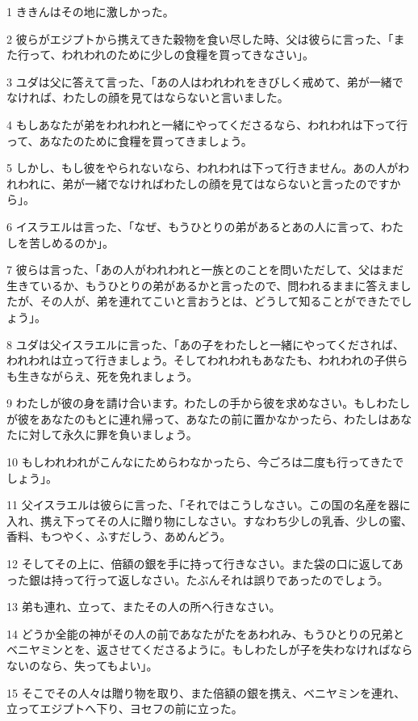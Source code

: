 \par 1 ききんはその地に激しかった。
\par 2 彼らがエジプトから携えてきた穀物を食い尽した時、父は彼らに言った、「また行って、われわれのために少しの食糧を買ってきなさい」。
\par 3 ユダは父に答えて言った、「あの人はわれわれをきびしく戒めて、弟が一緒でなければ、わたしの顔を見てはならないと言いました。
\par 4 もしあなたが弟をわれわれと一緒にやってくださるなら、われわれは下って行って、あなたのために食糧を買ってきましょう。
\par 5 しかし、もし彼をやられないなら、われわれは下って行きません。あの人がわれわれに、弟が一緒でなければわたしの顔を見てはならないと言ったのですから」。
\par 6 イスラエルは言った、「なぜ、もうひとりの弟があるとあの人に言って、わたしを苦しめるのか」。
\par 7 彼らは言った、「あの人がわれわれと一族とのことを問いただして、父はまだ生きているか、もうひとりの弟があるかと言ったので、問われるままに答えましたが、その人が、弟を連れてこいと言おうとは、どうして知ることができたでしょう」。
\par 8 ユダは父イスラエルに言った、「あの子をわたしと一緒にやってくだされば、われわれは立って行きましょう。そしてわれわれもあなたも、われわれの子供らも生きながらえ、死を免れましょう。
\par 9 わたしが彼の身を請け合います。わたしの手から彼を求めなさい。もしわたしが彼をあなたのもとに連れ帰って、あなたの前に置かなかったら、わたしはあなたに対して永久に罪を負いましょう。
\par 10 もしわれわれがこんなにためらわなかったら、今ごろは二度も行ってきたでしょう」。
\par 11 父イスラエルは彼らに言った、「それではこうしなさい。この国の名産を器に入れ、携え下ってその人に贈り物にしなさい。すなわち少しの乳香、少しの蜜、香料、もつやく、ふすだしう、あめんどう。
\par 12 そしてその上に、倍額の銀を手に持って行きなさい。また袋の口に返してあった銀は持って行って返しなさい。たぶんそれは誤りであったのでしょう。
\par 13 弟も連れ、立って、またその人の所へ行きなさい。
\par 14 どうか全能の神がその人の前であなたがたをあわれみ、もうひとりの兄弟とベニヤミンとを、返させてくださるように。もしわたしが子を失わなければならないのなら、失ってもよい」。
\par 15 そこでその人々は贈り物を取り、また倍額の銀を携え、ベニヤミンを連れ、立ってエジプトへ下り、ヨセフの前に立った。
